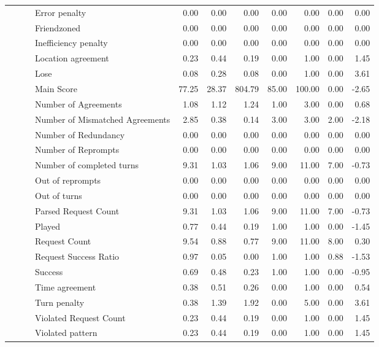 \begin{tabular}{llllrrrrrrr}
 &  &  & Error penalty & 0.00 & 0.00 & 0.00 & 0.00 & 0.00 & 0.00 & 0.00 \\
 &  &  & Friendzoned & 0.00 & 0.00 & 0.00 & 0.00 & 0.00 & 0.00 & 0.00 \\
 &  &  & Inefficiency penalty & 0.00 & 0.00 & 0.00 & 0.00 & 0.00 & 0.00 & 0.00 \\
 &  &  & Location agreement & 0.23 & 0.44 & 0.19 & 0.00 & 1.00 & 0.00 & 1.45 \\
 &  &  & Lose & 0.08 & 0.28 & 0.08 & 0.00 & 1.00 & 0.00 & 3.61 \\
 &  &  & Main Score & 77.25 & 28.37 & 804.79 & 85.00 & 100.00 & 0.00 & -2.65 \\
 &  &  & Number of Agreements & 1.08 & 1.12 & 1.24 & 1.00 & 3.00 & 0.00 & 0.68 \\
 &  &  & Number of Mismatched Agreements & 2.85 & 0.38 & 0.14 & 3.00 & 3.00 & 2.00 & -2.18 \\
 &  &  & Number of Redundancy & 0.00 & 0.00 & 0.00 & 0.00 & 0.00 & 0.00 & 0.00 \\
 &  &  & Number of Reprompts & 0.00 & 0.00 & 0.00 & 0.00 & 0.00 & 0.00 & 0.00 \\
 &  &  & Number of completed turns & 9.31 & 1.03 & 1.06 & 9.00 & 11.00 & 7.00 & -0.73 \\
 &  &  & Out of reprompts & 0.00 & 0.00 & 0.00 & 0.00 & 0.00 & 0.00 & 0.00 \\
 &  &  & Out of turns & 0.00 & 0.00 & 0.00 & 0.00 & 0.00 & 0.00 & 0.00 \\
 &  &  & Parsed Request Count & 9.31 & 1.03 & 1.06 & 9.00 & 11.00 & 7.00 & -0.73 \\
 &  &  & Played & 0.77 & 0.44 & 0.19 & 1.00 & 1.00 & 0.00 & -1.45 \\
 &  &  & Request Count & 9.54 & 0.88 & 0.77 & 9.00 & 11.00 & 8.00 & 0.30 \\
 &  &  & Request Success Ratio & 0.97 & 0.05 & 0.00 & 1.00 & 1.00 & 0.88 & -1.53 \\
 &  &  & Success & 0.69 & 0.48 & 0.23 & 1.00 & 1.00 & 0.00 & -0.95 \\
 &  &  & Time agreement & 0.38 & 0.51 & 0.26 & 0.00 & 1.00 & 0.00 & 0.54 \\
 &  &  & Turn penalty & 0.38 & 1.39 & 1.92 & 0.00 & 5.00 & 0.00 & 3.61 \\
 &  &  & Violated Request Count & 0.23 & 0.44 & 0.19 & 0.00 & 1.00 & 0.00 & 1.45 \\
 &  &  & Violated pattern & 0.23 & 0.44 & 0.19 & 0.00 & 1.00 & 0.00 & 1.45 \\

\end{tabular}

